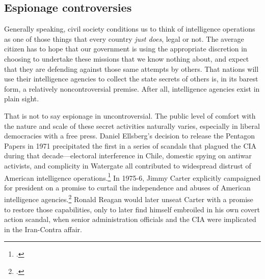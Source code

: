 \documentclass{memoir}
\begin{document}
\begin{refsegment}

\subsection{Espionage controversies}
Generally speaking, civil society conditions us to think of intelligence operations as one of those things that every country \emph{just does}, legal or not. The average citizen has to hope that our government is using the appropriate discretion in choosing to undertake these missions that we know nothing about, and expect that they are defending against those same attempts by others. That nations will use their intelligence agencies to collect the state secrets of others is, in its barest form, a relatively noncontroversial premise. After all, intelligence agencies exist in plain sight.

That is not to say espionage in uncontroversial. The public level of comfort with the nature and scale of these secret activities naturally varies, especially in liberal democracies with a free press. Daniel Ellsberg's decision to release the Pentagon Papers in 1971 precipitated the first in a series of scandals that plagued the CIA during that decade---electoral interference in Chile, domestic spying on antiwar activists, and complicity in Watergate all contributed to widespread distrust of American intelligence operations.\footcite[p.~214-215]{andrew_missing_1984} In 1975-6, Jimmy Carter explicitly campaigned for president on a promise to curtail the independence and abuses of American intelligence agencies.\footcite[p.~217]{andrew_missing_1984} Ronald Reagan would later unseat Carter with a promise to restore those capabilities, only to later find himself embroiled in his own covert action scandal, when senior administration officials and the CIA were implicated in the Iran-Contra affair.


\end{refsegment}
\end{document}
